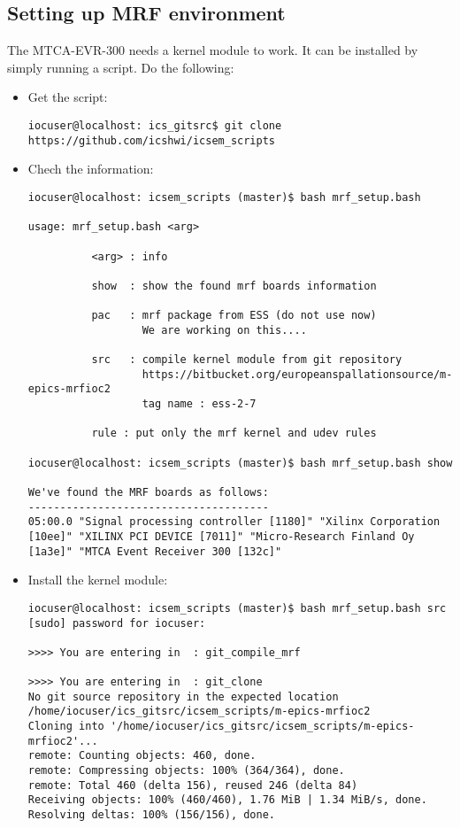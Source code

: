 \documentclass[11pt
  , a4paper
  , article
  , oneside
  , showtrims
]{memoir}
\begin{document}
\subsection{Setting up MRF environment}
The MTCA-EVR-300 needs a kernel module to work. It can be installed by simply running a script. Do the following:
\begin{itemize}
\item Get the script:
\begin{lstlisting}[style=termstyle]
iocuser@localhost: ics_gitsrc$ git clone https://github.com/icshwi/icsem_scripts
\end{lstlisting}
\item Chech the information:
\begin{lstlisting}[style=termstyle]
 iocuser@localhost: icsem_scripts (master)$ bash mrf_setup.bash 

usage: mrf_setup.bash <arg>

          <arg> : info

          show  : show the found mrf boards information 

          pac   : mrf package from ESS (do not use now) 
                  We are working on this.... 

          src   : compile kernel module from git repository 
                  https://bitbucket.org/europeanspallationsource/m-epics-mrfioc2
                  tag name : ess-2-7

          rule : put only the mrf kernel and udev rules 

iocuser@localhost: icsem_scripts (master)$ bash mrf_setup.bash show

We've found the MRF boards as follows:
--------------------------------------
05:00.0 "Signal processing controller [1180]" "Xilinx Corporation [10ee]" "XILINX PCI DEVICE [7011]" "Micro-Research Finland Oy [1a3e]" "MTCA Event Receiver 300 [132c]"
\end{lstlisting}
\item Install the kernel module:
\begin{lstlisting}[style=termstyle]
iocuser@localhost: icsem_scripts (master)$ bash mrf_setup.bash src
[sudo] password for iocuser: 

>>>> You are entering in  : git_compile_mrf

>>>> You are entering in  : git_clone
No git source repository in the expected location /home/iocuser/ics_gitsrc/icsem_scripts/m-epics-mrfioc2
Cloning into '/home/iocuser/ics_gitsrc/icsem_scripts/m-epics-mrfioc2'...
remote: Counting objects: 460, done.
remote: Compressing objects: 100% (364/364), done.
remote: Total 460 (delta 156), reused 246 (delta 84)
Receiving objects: 100% (460/460), 1.76 MiB | 1.34 MiB/s, done.
Resolving deltas: 100% (156/156), done.


\end{lstlisting}
\end{itemize}
\end{document}

